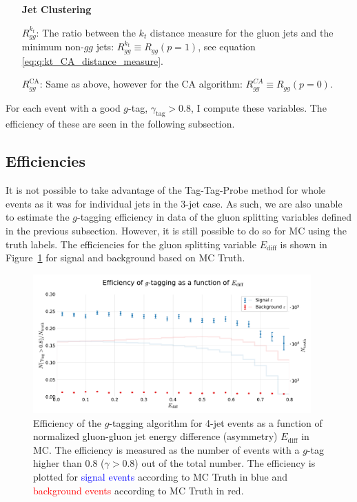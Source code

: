 \begin{enumerate}[leftmargin=*,labelindent=40pt]
  \item[] \textbf{Jet Clustering} 
  \item[$R_{gg}^{k_t}$:] The ratio between the $k_t$ distance measure for the gluon jets and the minimum non-$gg$ jets: $R_{gg}^{k_t} \equiv R_{gg}(p=1)$, see equation \eqref{eq:q:kt_CA_distance_measure}.
  \item[$R_{gg}^\mathrm{CA}$:] Same as above, however for the CA algorithm: $R_{gg}^{CA} \equiv R_{gg}(p=0)$. 
\end{enumerate}

For each event with a good $g$-tag, $\gamma_\mathrm{tag} > 0.8$, I compute these variables. The efficiency of these are seen in the following subsection. 

\subsection{Efficiencies}
\label{subsec:q:gluon_splitting_efficiency}
It is not possible to take advantage of the Tag-Tag-Probe method for whole events as it was for individual jets in the 3-jet case. As such, we are also unable to estimate the $g$-tagging efficiency in data of the gluon splitting variables defined in the previous subsection. However, it is still possible to do so for MC using the truth labels. The efficiencies for the gluon splitting variable $E_\mathrm{diff}$ is shown in Figure~\ref{fig:q:effiency_gtag_E_diff_non_appendix} for signal and background based on MC Truth.

\begin{figure}
  \centerfloat
  \includegraphics[width=0.95\textwidth, trim=10 10 10 45, clip, page=1]{figures/quarks/efficiency_events-down_sample=1.00-ML_vars=vertex-selection=b-ejet_min=4-n_iter_RS_lgb=99-n_iter_RS_xgb=9-cdot_cut=0.90-version=19-njet=4.pdf}
  \caption[$g$-Tagging Efficiency for 4-Jet Events in MC as a Function of the Normalized Gluon-Gluon Jet Energy Difference Asymmetry $E_\mathrm{diff}$]
          {Efficiency of the $g$-tagging algorithm for 4-jet events as a function of normalized gluon-gluon jet energy difference (asymmetry) $E_\mathrm{diff}$  in MC. The efficiency is measured as the number of events with a $g$-tag higher than 0.8 ($\gamma > 0.8$) out of the total number. The efficiency is plotted for \textcolor{blue}{signal events} according to MC Truth in blue and \textcolor{red}{background events} according to MC Truth in red.
          } 
  \label{fig:q:effiency_gtag_E_diff_non_appendix}
\end{figure}

